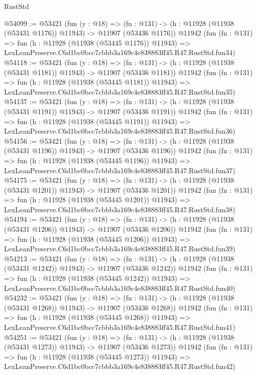 \begin{lexlean}{RustStd}
\begin{coremodule}
@54099 := @53421
    (fun (y : @18) =>
    (fn : @131) -> (h : @11928 (@11938 (@53431 @1176)) @11943) -> @11907 (@53436 @1176))
    @11942
    (fun (fn : @131) =>
    fun (h : @11928 (@11938 (@53445 @1176)) @11943) =>
    LexLeanPreserve.C6d1bc0bcc7cbbb3a169c4e838883ff45.R47.RustStd.fun34)
@54118 := @53421
    (fun (y : @18) =>
    (fn : @131) -> (h : @11928 (@11938 (@53431 @1181)) @11943) -> @11907 (@53436 @1181))
    @11942
    (fun (fn : @131) =>
    fun (h : @11928 (@11938 (@53445 @1181)) @11943) =>
    LexLeanPreserve.C6d1bc0bcc7cbbb3a169c4e838883ff45.R47.RustStd.fun35)
@54137 := @53421
    (fun (y : @18) =>
    (fn : @131) -> (h : @11928 (@11938 (@53431 @1191)) @11943) -> @11907 (@53436 @1191))
    @11942
    (fun (fn : @131) =>
    fun (h : @11928 (@11938 (@53445 @1191)) @11943) =>
    LexLeanPreserve.C6d1bc0bcc7cbbb3a169c4e838883ff45.R47.RustStd.fun36)
@54156 := @53421
    (fun (y : @18) =>
    (fn : @131) -> (h : @11928 (@11938 (@53431 @1196)) @11943) -> @11907 (@53436 @1196))
    @11942
    (fun (fn : @131) =>
    fun (h : @11928 (@11938 (@53445 @1196)) @11943) =>
    LexLeanPreserve.C6d1bc0bcc7cbbb3a169c4e838883ff45.R47.RustStd.fun37)
@54175 := @53421
    (fun (y : @18) =>
    (fn : @131) -> (h : @11928 (@11938 (@53431 @1201)) @11943) -> @11907 (@53436 @1201))
    @11942
    (fun (fn : @131) =>
    fun (h : @11928 (@11938 (@53445 @1201)) @11943) =>
    LexLeanPreserve.C6d1bc0bcc7cbbb3a169c4e838883ff45.R47.RustStd.fun38)
@54194 := @53421
    (fun (y : @18) =>
    (fn : @131) -> (h : @11928 (@11938 (@53431 @1206)) @11943) -> @11907 (@53436 @1206))
    @11942
    (fun (fn : @131) =>
    fun (h : @11928 (@11938 (@53445 @1206)) @11943) =>
    LexLeanPreserve.C6d1bc0bcc7cbbb3a169c4e838883ff45.R47.RustStd.fun39)
@54213 := @53421
    (fun (y : @18) =>
    (fn : @131) -> (h : @11928 (@11938 (@53431 @1242)) @11943) -> @11907 (@53436 @1242))
    @11942
    (fun (fn : @131) =>
    fun (h : @11928 (@11938 (@53445 @1242)) @11943) =>
    LexLeanPreserve.C6d1bc0bcc7cbbb3a169c4e838883ff45.R47.RustStd.fun40)
@54232 := @53421
    (fun (y : @18) =>
    (fn : @131) -> (h : @11928 (@11938 (@53431 @1268)) @11943) -> @11907 (@53436 @1268))
    @11942
    (fun (fn : @131) =>
    fun (h : @11928 (@11938 (@53445 @1268)) @11943) =>
    LexLeanPreserve.C6d1bc0bcc7cbbb3a169c4e838883ff45.R47.RustStd.fun41)
@54251 := @53421
    (fun (y : @18) =>
    (fn : @131) -> (h : @11928 (@11938 (@53431 @1273)) @11943) -> @11907 (@53436 @1273))
    @11942
    (fun (fn : @131) =>
    fun (h : @11928 (@11938 (@53445 @1273)) @11943) =>
    LexLeanPreserve.C6d1bc0bcc7cbbb3a169c4e838883ff45.R47.RustStd.fun42)

\end{coremodule}
\end{lexlean}
